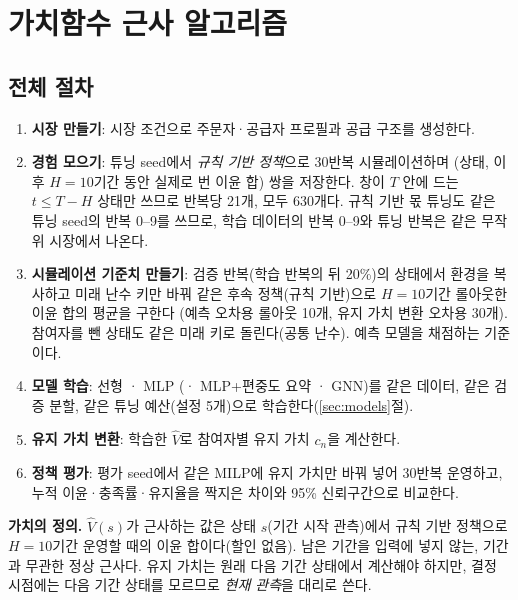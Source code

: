 \documentclass[11pt,a4paper]{article}
\begin{document}
\section{가치함수 근사 알고리즘}

\subsection{전체 절차}

\begin{enumerate}[leftmargin=1.5em]
  \item \textbf{시장 만들기}: 시장 조건으로 주문자·공급자 프로필과 공급 구조를 생성한다.
  \item \textbf{경험 모으기}: 튜닝 seed에서 \emph{규칙 기반 정책}으로 30반복 시뮬레이션하며
        (상태, 이후 $H=10$기간 동안 실제로 번 이윤 합) 쌍을 저장한다. 창이 $T$ 안에 드는 $t\le T-H$ 상태만 쓰므로
        반복당 21개, 모두 630개다. 규칙 기반 몫 튜닝도 같은 튜닝 seed의 반복 0--9를 쓰므로,
        학습 데이터의 반복 0--9와 튜닝 반복은 같은 무작위 시장에서 나온다.
  \item \textbf{시뮬레이션 기준치 만들기}: 검증 반복(학습 반복의 뒤 20\%)의 상태에서 환경을 복사하고
        미래 난수 키만 바꿔 같은 후속 정책(규칙 기반)으로 $H=10$기간 롤아웃한 이윤 합의 평균을 구한다
        (예측 오차용 롤아웃 10개, 유지 가치 변환 오차용 30개). 참여자를 뺀 상태도 같은 미래 키로 돌린다(공통 난수).
        예측 모델을 채점하는 기준이다.
  \item \textbf{모델 학습}: 선형 · MLP (· MLP+편중도 요약 · GNN)를 같은 데이터, 같은 검증 분할,
        같은 튜닝 예산(설정 5개)으로 학습한다(\ref{sec:models}절).
  \item \textbf{유지 가치 변환}: 학습한 $\hat V$로 참여자별 유지 가치 $c_n$을 계산한다.
  \item \textbf{정책 평가}: 평가 seed에서 같은 MILP에 유지 가치만 바꿔 넣어 30반복 운영하고,
        누적 이윤·충족률·유지율을 짝지은 차이와 95\% 신뢰구간으로 비교한다.
\end{enumerate}

\textbf{가치의 정의.} $\hat V(s)$가 근사하는 값은 상태 $s$(기간 시작 관측)에서 규칙 기반 정책으로
$H=10$기간 운영할 때의 이윤 합이다(할인 없음). 남은 기간을 입력에 넣지 않는, 기간과 무관한 정상 근사다.
유지 가치는 원래 다음 기간 상태에서 계산해야 하지만, 결정 시점에는 다음 기간 상태를 모르므로
\emph{현재 관측}을 대리로 쓴다.
\end{document}
